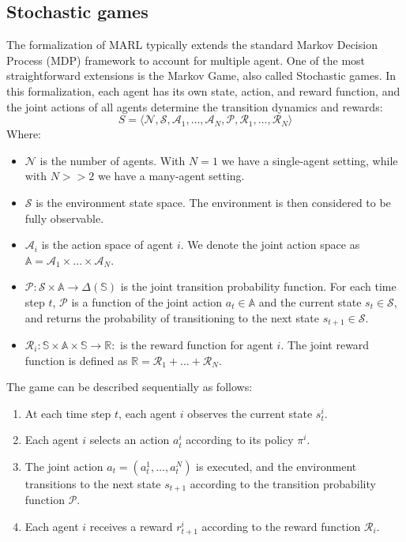 \subsection{Stochastic games}
The formalization of MARL typically extends the standard Markov Decision Process (MDP) 
 framework to account for multiple agent. 
 One of the most straightforward extensions is the Markov Game, also called Stochastic games. 
 In this formalization, 
each agent has its own state, action, and reward function, 
and the joint actions of all agents determine the transition dynamics and rewards: 
\begin{equation}
S = \langle \mathcal{N}, \mathcal{S}, \mathcal{A}_1, \ldots, \mathcal{A}_N, \mathcal{P}, \mathcal{R}_1, \ldots, \mathcal{R}_N \rangle
\end{equation}
Where:
\begin{itemize}
    \item $\mathcal{N}$ is the number of agents. 
    With $N=1$ we have a single-agent setting, while with $N >> 2$ we have a many-agent setting.
    \item $\mathcal{S}$ is the environment state space. The environment is then considered to be fully observable. 
    \item $\mathcal{A}_i$ is the action space of agent $i$. We denote the joint action space as $\mathbb{A} = \mathcal{A}_1 \times \ldots \times \mathcal{A}_N$.
    \item $\mathcal{P}: \mathcal{S} \times \mathbb{A} \rightarrow \Delta(\mathbb{S})$ is the joint transition probability function. 
    For each time step $t$, $\mathcal{P}$ is a function of the joint action $a_t \in \mathbb{A}$ and the current state $s_t \in \mathcal{S}$, 
    and returns the probability of transitioning to the next state $s_{t+1} \in \mathcal{S}$.
    \item $\mathcal{R}_i: \mathbb{S} \times \mathbb{A} \times \mathbb{S} \rightarrow \mathbb{R}: $ is the reward function for agent $i$. 
    The joint reward function is defined as $\mathbb{R} = \mathcal{R}_1 + \ldots + \mathcal{R}_N$.
\end{itemize}
The game can be described sequentially as follows:
\begin{enumerate}
    \item At each time step $t$, each agent $i$ observes the current state $s_t^i$.
    \item Each agent $i$ selects an action $a_t^i$ according to its policy $\pi^i$.
    \item The joint action $a_t = (a_t^1, \ldots, a_t^N)$ is executed, and the environment transitions to the next state $s_{t+1}$ according to the transition probability function $\mathcal{P}$.
    \item Each agent $i$ receives a reward $r_{t+1}^i$ according to the reward function $\mathcal{R}_i$.
\end{enumerate}

